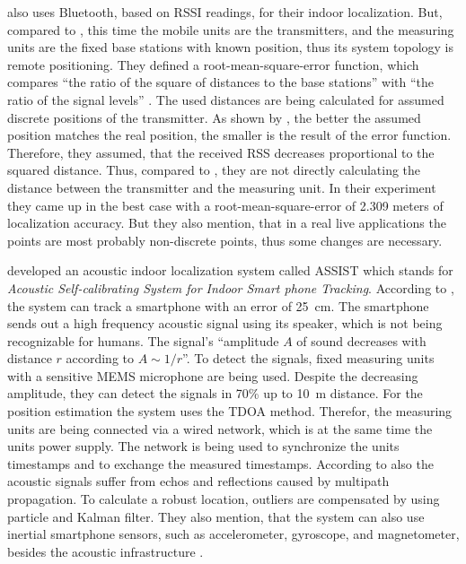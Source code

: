 \citet{oksar:bluetooth} also uses Bluetooth, based on \acs{RSSI} readings, for their indoor localization. But, compared to \citet{wang:bt_pos}, this time the mobile units are the transmitters, and the measuring units are the fixed base stations with known position, thus its system topology is remote positioning. They defined a root-mean-square-error function, which compares ``the ratio of the square of distances to the base stations'' with ``the ratio of the signal levels'' \citep{oksar:bluetooth}. The used distances are being calculated for assumed discrete positions of the transmitter. As shown by \citet{oksar:bluetooth}, the better the assumed position matches the real position, the smaller is the result of the error function. Therefore, they assumed, that the received \acs{RSS} decreases proportional to the squared distance. Thus, compared to \citet{wang:bt_pos}, they are not directly calculating the distance between the transmitter and the measuring unit. In their experiment they came up in the best case with a root-mean-square-error of 2.309 meters of localization accuracy. But they also mention, that in a real live applications the points are most probably non-discrete points, thus some changes are necessary.

\citet{hoflinger:acoustic} developed an acoustic indoor localization system called ASSIST which stands for \emph{Acoustic Self-calibrating System for Indoor Smart phone Tracking}. According to \citet{hoflinger:acoustic}, the system can track a smartphone with an error of 25~cm. The smartphone sends out a high frequency acoustic signal using its speaker, which is not being recognizable for humans. The signal's ``amplitude $A$ of sound decreases with distance $r$ according to $A \sim 1/r$''. To detect the signals, fixed measuring units with a sensitive MEMS microphone are being used. Despite the decreasing amplitude, they can detect the signals in 70\% up to 10~m distance. For the position estimation the system uses the \acs{TDOA} method. Therefor, the measuring units are being connected via a wired network, which is at the same time the units power supply. The network is being used to synchronize the units timestamps and to exchange the measured timestamps. According to \citet{hoflinger:acoustic} also the acoustic signals suffer from echos and reflections caused by multipath propagation. To calculate a robust location, outliers are compensated by using particle and Kalman filter. They also mention, that the system can also use inertial smartphone sensors, such as accelerometer, gyroscope, and magnetometer, besides the acoustic infrastructure \citep{hoflinger:acoustic, hoflinger:assist}.

